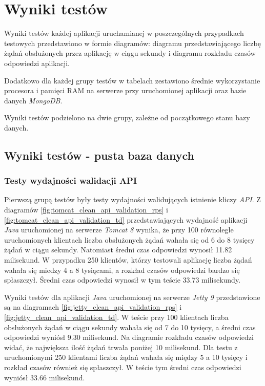 \chapter{Wyniki testów}
Wyniki testów każdej aplikacji uruchamianej w poszczególnych przypadkach  testowych przedstawiono w formie diagramów: diagramu przedstawiającego liczbę żądań obsłużonych przez aplikację w ciągu sekundy i diagramu rozkładu czasów odpowiedzi aplikacji.

Dodatkowo dla każdej grupy testów w  tabelach zestawiono średnie  wykorzystanie procesora i pamięci RAM na serwerze przy uruchomionej aplikacji oraz bazie danych \textsl{MongoDB}.

Wyniki testów podzielono na dwie grupy, zależne od początkowego stanu bazy danych.

\section{Wyniki testów - pusta baza danych}

\subsection{Testy wydajności walidacji API}
Pierwszą grupą testów były testy wydajności walidujących istnienie kliczy \textsl{API}. Z diagramów \ref{fig:tomcat_clean_api_validation_rps} i \ref{fig:tomcat_clean_api_validation_td} przedstawiających wydajność aplikacji \textsl{Java} uruchomionej na serwerze \textsl{Tomcat 8} wynika, że przy 100 równolegle uruchomionych klientach liczba obsłużonych żądań wahała się od 6 do 8 tysięcy żądań w ciągu sekundy. Natomiast średni czas odpowiedzi wynosił 11.82 milisekund. W przypadku 250 klientów, którzy testowali aplikację liczba żądań wahała się miedzy 4 a 8 tysiącami, a rozkład czasów odpowiedzi bardzo się spłaszczył. Średni czas odpowiedzi wynosił w tym teście 33.73 milisekundy.

Wyniki testów dla aplikacji \textsl{Java} uruchomionej na serwerze \textsl{Jetty 9} przedstawione są na diagramach \ref{fig:jetty_clean_api_validation_rps} i \ref{fig:jetty_clean_api_validation_td}. W teście przy 100 klientach liczba obsłużonych żądań w ciągu sekundy wahała się od 7 do 10 tysięcy, a średni czas odpowiedzi wyniósł 9.30 milisekund. Na diagramie rozkładu czasów odpowiedzi widać, że największa ilość żądań trwała poniżej 10 milisekund. Dla testu z uruchomionymi 250 klientami liczba żądań wahała się między 5 a 10 tysięcy i rozkład czasów również się spłaszczył. W teście tym średni czas odpowiedzi wyniósł 33.66 milisekund. 


